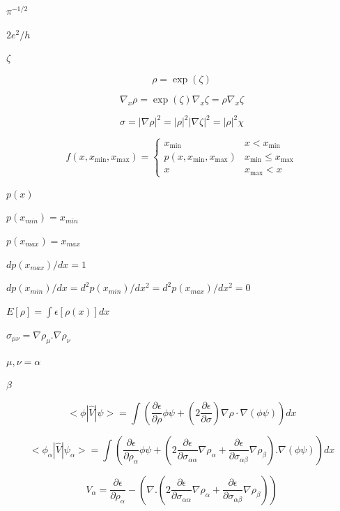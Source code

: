 \documentclass{article}
\begin{document}
$\pi^{-1/2}$
\pagebreak

$ 2e^2/h $
\pagebreak

$ \zeta $
\pagebreak

\[
\rho = \exp(\zeta)
\]
\pagebreak

\[
\nabla_x\rho = \exp(\zeta)\nabla_x\zeta = \rho \nabla_x\zeta
\]
\pagebreak

\[
  \sigma = |\nabla\rho|^2 = |\rho|^2 |\nabla\zeta|^2 = |\rho|^2 \chi
\]
\pagebreak

\[
f(x,x_{\mathrm{min}},x_{\mathrm{max}}) = \left\{
  \begin{array}{ll}
    x_{\mathrm{min}}                       & x < x_{\mathrm{min}} \\
    p(x,x_{\mathrm{min}},x_{\mathrm{max}}) & x_{\mathrm{min}} \leq x_{\mathrm{max}} \\
    x                                      & x_{\mathrm{max}} < x
  \end{array}
\right.
\]
\pagebreak

$p(x)$
\pagebreak

$p(x_{min})=x_{min}$
\pagebreak

$p(x_{max})=x_{max}$
\pagebreak

$dp(x_{max})/dx=1$
\pagebreak

$dp(x_{min})/dx=d^2p(x_{min})/dx^2=d^2p(x_{max})/dx^2=0$
\pagebreak

$ E[\rho] = \int \epsilon[\rho(x)] dx$
\pagebreak

$ \sigma_{\mu \nu} = \nabla \rho_{\mu} . \nabla \rho_{\nu} $
\pagebreak

$ \mu, \nu = \alpha$
\pagebreak

$ \beta $
\pagebreak

\[
  < \phi | \hat V | \psi > = \int \left( \frac{\partial \epsilon}{\partial \rho} \phi \psi
                 +  \left( 2 \frac{\partial \epsilon}{\partial \sigma} \right)
                 \nabla \rho \cdot \nabla \left( \phi \psi \right) \right) dx
\]
\pagebreak

\[
  < \phi_{\alpha} | \hat V | \psi_{\alpha} > = \int \left( \frac{\partial \epsilon}{\partial \rho_{\alpha}} \phi \psi
           +  \left( 2 \frac{\partial \epsilon}{\partial \sigma_{\alpha \alpha}} \nabla \rho_{\alpha}
           + \frac{\partial \epsilon}{\partial \sigma_{\alpha \beta}} \nabla \rho_{\beta}  \right) . \nabla \left( \phi \psi \right) \right) dx
\]
\pagebreak

\[
   V_{\alpha} =  \frac{\partial \epsilon}{\partial \rho_{\alpha}}
                 - \left(\nabla . \left(2 \frac{\partial \epsilon}{\partial \sigma_{\alpha \alpha}} \nabla \rho_{\alpha}
                 + \frac{\partial \epsilon}{\partial \sigma_{\alpha \beta}} \nabla \rho_{\beta}  \right)  \right)
\]
\pagebreak
\end{document}
